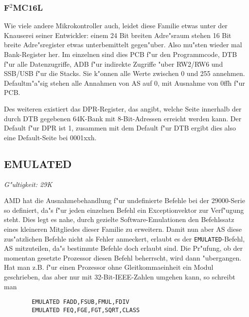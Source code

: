\documentclass[12pt,a4paper,twoside]{report}
\makeatletter
\newcommand{\tty}[1]{{\tt #1}}
\newcommand{\ttindex}[1]{\index{#1@{\tt #1}}}
\makeatother
\begin{document}

\subsubsection{F$^2$MC16L}

Wie viele andere Mikrokontroller auch, leidet diese Familie etwas unter
der Knauserei seiner Entwickler: einem 24 Bit breiten Adre"sraum stehen 16
Bit breite Adre"sregister etwas unterbemittelt gegen"uber.  Also mu"sten
wieder mal Bank-Register her.  Im einzelnen sind dies PCB f"ur den
Programmcode, DTB f"ur alle Datenzugriffe, ADB f"ur indirekte Zugriffe
"uber RW2/RW6 und SSB/USB f"ur die Stacks.  Sie k"onnen alle Werte
zwischen 0 und 255 annehmen.  Defaultm"a"sig stehen alle Annahmen von AS
auf 0, mit Ausnahme von 0ffh f"ur PCB.

Des weiteren existiert das DPR-Register, das angibt, welche Seite
innerhalb der durch DTB gegebenen 64K-Bank mit 8-Bit-Adressen erreicht
werden kann.  Der Default f"ur DPR ist 1, zusammen mit dem Default f"ur
DTB ergibt dies also eine Default-Seite bei 0001xxh.


\subsection{EMULATED}
\ttindex{EMULATED}

{\em G"ultigkeit: 29K}

AMD hat die Ausnahmebehandlung f"ur undefinierte Befehle bei der
29000-Serie so definiert, da"s f"ur jeden einzelnen Befehl ein
Exceptionvektor zur Verf"ugung steht.  Dies legt es nahe, durch
gezielte Software-Emulationen den Befehlssatz eines kleineren
Mitgliedes dieser Familie zu erweitern.  Damit nun aber AS diese
zus"atzlichen Befehle nicht als Fehler anmeckert, erlaubt es der
\tty{EMULATED}-Befehl, AS mitzuteilen, da"s bestimmte Befehle doch
erlaubt sind.  Die Pr"ufung, ob der momentan gesetzte Prozessor
diesen Befehl beherrscht, wird dann "ubergangen.  Hat man z.B. f"ur
einen Prozessor ohne Gleitkommaeinheit ein Modul geschrieben, das
aber nur mit 32-Bit-IEEE-Zahlen umgehen kann, so schreibt man
\begin{verbatim}
        EMULATED FADD,FSUB,FMUL,FDIV
        EMULATED FEQ,FGE,FGT,SQRT,CLASS
\end{verbatim}
\end{document}
